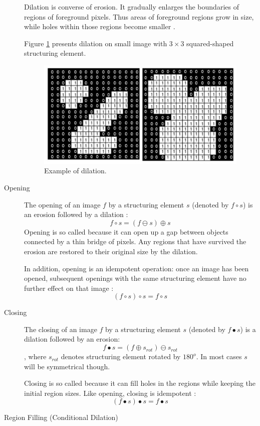 \documentclass{article}
\begin{document}
\begin{description}
Dilation is converse of erosion. It gradually enlarges the boundaries of regions of foreground pixels. Thus areas of foreground regions grow in size, while holes within those regions become smaller \cite{slajdy_morph}.

Figure \ref{fig:dilation_exampl} presents dilation on small image with $3 \times 3$ squared-shaped structuring element.
\begin{figure}[H]
  \centering
  \includegraphics[width=0.4\linewidth]{_Figures/dilation_example.jpg}
  \caption{Example of dilation.}
  \label{fig:dilation_exampl}
\end{figure}%

%
% 
\item[Opening]
The opening of an image $f$  by a structuring element $s$ (denoted by $f \circ s$) is an erosion followed by a dilation \cite{morphological}: 
\[
f \circ s = (f \ominus s) \oplus s
\]
Opening is so called because it can open up a gap between objects connected by a thin bridge of pixels. Any regions that have survived the erosion are restored to their original size by the dilation.

In addition, opening is an idempotent operation: once an image has been opened, subsequent openings with the same structuring element have no further effect on that image \cite{morphological}:
\[
(f \circ s) \circ s = f \circ s
\]


%
%
\item[Closing] The closing of an image $f$  by a structuring element $s$ (denoted by $f \bullet s$) is a dilation followed by an erosion: 
\[
f \bullet s = (f \oplus s_{rot}) \ominus s_{rot}
\]
, where $s_{rot}$ denotes structuring element rotated by $180^{o}$. In most cases $s$ will be symmetrical though.

Closing is so called because it can fill holes in the regions while keeping the initial region sizes. Like opening, closing is idempotent \cite{morphological}:
\[
(f \bullet s) \bullet s = f \bullet s
\]
%
%
\item[Region Filling (Conditional Dilation)]

\end{description} 
\pagebreak
 
\end{document}

